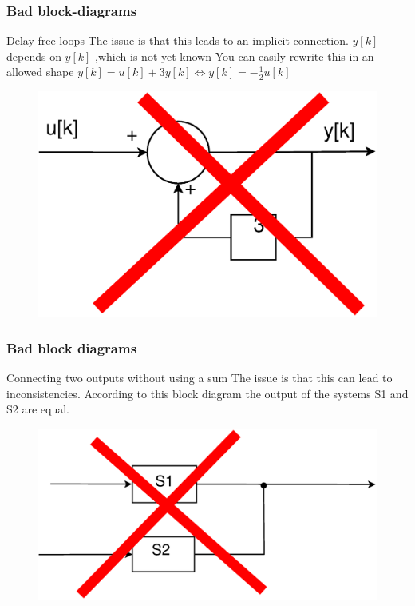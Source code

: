 \begin{frame}
	\frametitle{Bad block-diagrams}

				\begin{alertblock}{Delay-free loops}
					The issue is that this leads to an implicit connection. 
					$y[k]$ depends on $y[k]$ ,which is not yet known
					You can easily rewrite this in an allowed shape
					$y[k] = u[k]  + 3 y[k] \Longleftrightarrow y[k] = -\frac{1}{2} u[k]$
					\begin{figure}
						\centering
						\includegraphics[height=0.4\textheight]{Images/Discrete_time_eps_10.eps}
					\end{figure}
				\end{alertblock}
\end{frame}
\begin{frame}
	\frametitle{Bad block diagrams}
		\begin{alertblock}{Connecting two outputs without using a sum}
			The issue is that this can lead to inconsistencies.	According to this block diagram the output of the systems S1 and S2 are equal.
			\begin{figure}
				\centering
				\includegraphics[width = 0.5\linewidth]{Images/Discrete_time_eps_15.eps}
			\end{figure}
		\end{alertblock}
\end{frame}
